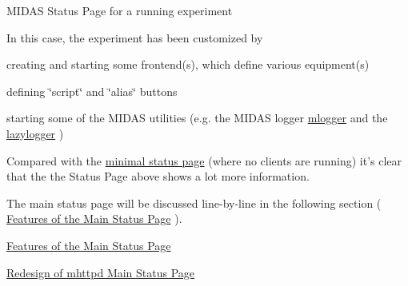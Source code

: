 \begin{center} MIDAS Status Page for a running experiment \par
\par
\par
  \end{center}  \par


In this case, the experiment has been customized by
\begin{DoxyItemize}
\item creating and starting some frontend(s), which define various equipment(s)
\item defining \char`\"{}script\char`\"{} and \char`\"{}alias\char`\"{} buttons
\item starting some of the MIDAS utilities (e.g. the MIDAS logger \hyperlink{F_Logging_F_mlogger_utility}{mlogger} and the \hyperlink{F_LogUtil_F_lazylogger_utility}{lazylogger} )
\end{DoxyItemize}

Compared with the \hyperlink{RC_mhttpd_utility_RC_mhttpd_minimal_status_page}{minimal status page} (where no clients are running) it's clear that the the Status Page above shows a lot more information.

The main status page will be discussed line-\/by-\/line in the following section ( \hyperlink{RC_mhttpd_status_page_features}{Features of the Main Status Page} ).


\begin{DoxyItemize}
\item \hyperlink{RC_mhttpd_status_page_features}{Features of the Main Status Page}
\item \hyperlink{RC_mhttpd_status_page_redesign}{Redesign of mhttpd Main Status Page}
\end{DoxyItemize}



\label{index_end}
\hypertarget{index_end}{}

